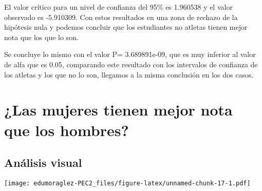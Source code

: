 \documentclass[
]{article}
\newenvironment{Shaded}{\begin{snugshade}}{\end{snugshade}}
\newcommand{\AttributeTok}[1]{\textcolor[rgb]{0.80,0.80,0.80}{#1}}
\newcommand{\ConstantTok}[1]{\textcolor[rgb]{0.86,0.64,0.64}{\textbf{#1}}}
\newcommand{\FunctionTok}[1]{\textcolor[rgb]{0.94,0.94,0.56}{#1}}
\newcommand{\NormalTok}[1]{\textcolor[rgb]{0.80,0.80,0.80}{#1}}
\newcommand{\OtherTok}[1]{\textcolor[rgb]{0.94,0.94,0.56}{#1}}
\newcommand{\SpecialCharTok}[1]{\textcolor[rgb]{0.86,0.64,0.64}{#1}}
\newcommand{\StringTok}[1]{\textcolor[rgb]{0.80,0.58,0.58}{#1}}
\begin{document}
El valor crítico para un nivel de confianza del 95\% es 1.960538 y el
valor observado es -5.910309. Con estos resultados en una zona de
rechazo de la hipótesis nula y podemos concluir que los estudiantes no
atletas tienen mejor nota que los que lo son.

Se concluye lo mismo con el valor P= 3.689891e-09, que es muy inferior
al valor de alfa que es 0.05, comparando este resultado con los
intervalos de confianza de los atletas y los que no lo son, llegamos a
la misma conclusión en los dos casos.

\hypertarget{las-mujeres-tienen-mejor-nota-que-los-hombres}{%
\section{¿Las mujeres tienen mejor nota que los
hombres?}\label{las-mujeres-tienen-mejor-nota-que-los-hombres}}

\hypertarget{anuxe1lisis-visual-1}{%
\subsection{Análisis visual}\label{anuxe1lisis-visual-1}}

\begin{Shaded}
\end{Shaded}

\texttt{[image: edumoraglez-PEC2\_files/figure-latex/unnamed-chunk-17-1.pdf]}

\begin{Shaded}
\end{Shaded}
\end{document}
